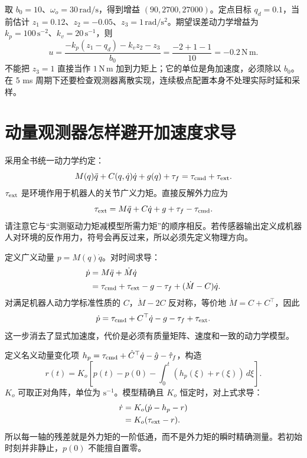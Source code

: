\begin{examplebox}
取 $b_0=10$、$\omega_o=30\,\mathrm{rad/s}$，得到增益 $(90,2700,27000)$。定点目标 $q_d=0.1$，当前估计 $z_1=0.12$、$z_2=-0.05$、$z_3=1\,\mathrm{rad/s^2}$。期望误差动力学增益为 $k_p=100\,\mathrm{s^{-2}}$、$k_v=20\,\mathrm{s^{-1}}$，则
\[
u=\frac{-k_p(z_1-q_d)-k_vz_2-z_3}{b_0}
=\frac{-2+1-1}{10}=-0.2\,\mathrm{N\,m}.
\]
不能把 $z_3=1$ 直接当作 $1\,\mathrm{N\,m}$ 加到力矩上；它的单位是角加速度，必须除以 $b_0$。在 5 ms 周期下还要检查观测器离散实现，连续极点配置本身不处理实际时延和采样。
\end{examplebox}

\section{动量观测器怎样避开加速度求导}

采用全书统一动力学约定：
\begin{equation}
M(q)\ddot q+C(q,\dot q)\dot q+g(q)+\tau_f
=\tau_{\rm cmd}+\tau_{\rm ext}.
\end{equation}
$\tau_{\rm ext}$ 是环境作用于机器人的关节广义力矩。直接反解外力应为
\begin{equation}
\tau_{\rm ext}=M\ddot q+C\dot q+g+\tau_f-\tau_{\rm cmd}.
\label{eq:cf_direct_external}
\end{equation}
请注意它与“实测驱动力矩减模型所需力矩”的顺序相反。若传感器输出定义成机器人对环境的反作用力，符号会再反过来，所以必须先定义物理方向。

定义广义动量 $p=M(q)\dot q$。对时间求导：
\begin{align}
\dot p&=M\ddot q+\dot M\dot q\\
&=\tau_{\rm cmd}+\tau_{\rm ext}-g-\tau_f+(\dot M-C)\dot q.
\end{align}
对满足机器人动力学标准性质的 $C$，$\dot M-2C$ 反对称，等价地 $\dot M=C+C^\top$，因此
\begin{equation}
\dot p=\tau_{\rm cmd}+C^\top\dot q-g-\tau_f+\tau_{\rm ext}.
\end{equation}
这一步消去了显式加速度，代价是必须有质量矩阵、速度和一致的动力学模型。

定义名义动量变化项 $h_p=\tau_{\rm cmd}+\hat C^\top\dot q-\hat g-\hat\tau_f$，构造
\begin{equation}
r(t)=K_o\left[p(t)-p(0)-\int_0^t(h_p(\xi)+r(\xi))\,d\xi\right].
\end{equation}
$K_o$ 可取正对角阵，单位为 $\mathrm{s^{-1}}$。模型精确且 $K_o$ 恒定时，对上式求导：
\begin{align}
\dot r&=K_o(\dot p-h_p-r)\\
&=K_o(\tau_{\rm ext}-r).
\end{align}
所以每一轴的残差就是外力矩的一阶低通，而不是外力矩的瞬时精确测量。若初始时刻并非静止，$p(0)$ 不能擅自置零。

